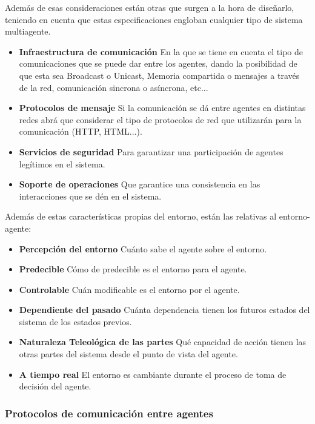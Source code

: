 Además de esas consideraciones están otras que surgen a la hora de diseñarlo, teniendo en cuenta que estas especificaciones engloban cualquier tipo de sistema multiagente.

\begin{itemize}
	\item\textbf{Infraestructura de comunicación} En la que se tiene en cuenta el tipo de comunicaciones que se puede dar entre los agentes, dando la posibilidad de que esta sea Broadcast o Unicast, Memoria compartida o mensajes a través de la red, comunicación sincrona o asíncrona, etc...
	\item\textbf{Protocolos de mensaje} Si la comunicación se dá entre agentes en distintas redes abrá que considerar el tipo de protocolos de red que utilizarán para la comunicación (HTTP, HTML...).
	\item\textbf{Servicios de seguridad} Para garantizar una participación de agentes legítimos en el sistema.
	\item\textbf{Soporte de operaciones} Que garantice una consistencia en las interacciones que se dén en el sistema.
\end{itemize}

Además de estas características propias del entorno, están las relativas al entorno-agente:

\begin{itemize}
	\item\textbf{Percepción del entorno} Cuánto sabe el agente sobre el entorno.
	\item\textbf{Predecible} Cómo de predecible es el entorno para el agente.
	\item\textbf{Controlable} Cuán modificable es el entorno por el agente.
	\item\textbf{Dependiente del pasado} Cuánta dependencia tienen los futuros estados del sistema de los estados previos.
	\item\textbf{Naturaleza Teleológica de las partes} Qué capacidad de acción tienen las otras partes del sistema desde el punto de vista del agente.
	\item\textbf{A tiempo real} El entorno es cambiante durante el proceso de toma de decisión del agente.
\end{itemize}

\subsubsection{Protocolos de comunicación entre agentes}


